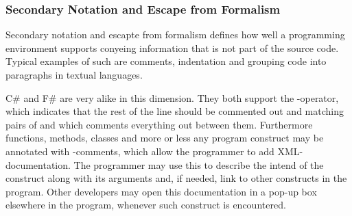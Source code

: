 \subsubsection{Secondary Notation and Escape from Formalism}
Secondary notation and escapte from formalism defines how well a programming environment supports conyeing information that is not part of the source code. Typical examples of such are comments, indentation and grouping code into paragraphs in textual languages\cite{green1996usability}.

C\# and F\# are very alike in this dimension. They both support the \ttt{//}-operator, which indicates that the rest of the line should be commented out and matching pairs of \ttt{/*} and \ttt{*/} which comments everything out between them. Furthermore functions, methods, classes and more or less any program construct may be annotated with \ttt{///}-comments, which allow the programmer to add \gls{XML}-documentation\cite{fsharp:xml:doc}. The programmer may use this to describe the intend of the construct along with its arguments and, if needed, link to other constructs in the program. Other developers may open this documentation in a pop-up box elsewhere in the program, whenever such construct is encountered.